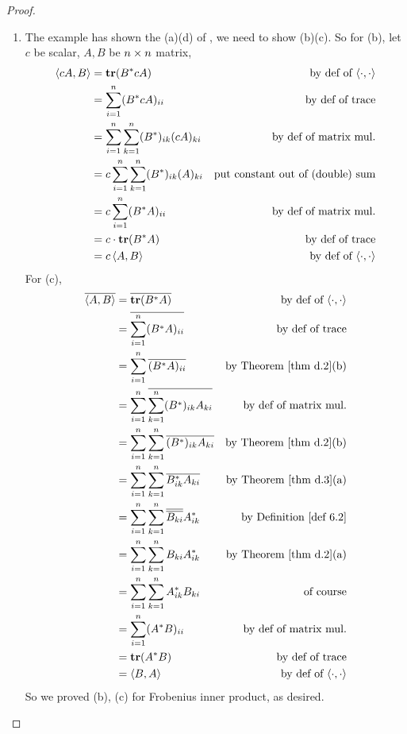 \begin{proof} \ 

\begin{enumerate}
\item The example has shown the (a)(d) of , we need to show (b)(c).
So for (b), let \(c\) be scalar, \(A, B\) be \(n \times n\) matrix,
\begin{align*}
    \left< cA, B \right> & = \textbf{tr}(B^* cA) & \text{by def of \(\left<\cdot, \cdot \right>\)} \\
        & = \sum_{i = 1}^n (B^* cA)_{ii} & \text{by def of trace} \\
        & = \sum_{i = 1}^n \sum_{k = 1}^n (B^*)_{ik} (cA)_{ki} & \text{by def of matrix mul.} \\
        & = c \sum_{i = 1}^n \sum_{k = 1}^n (B^*)_{ik} (A)_{ki} & \text{put constant out of (double) sum} \\
        & = c \sum_{i = 1}^n (B^* A)_{ii} & \text{by def of matrix mul.} \\
        & = c \cdot \textbf{tr}(B^* A) & \text{by def of trace} \\
        & = c \left< A, B \right> & \text{by def of \(\left<\cdot, \cdot \right>\)}
\end{align*}
For (c),
\begin{align*}
    \conjugatet{\LG A, B \RG} & = \conjugatet{\TRACE(B^* A)} & \text{by def of \(\InnerOp\)} \\
        & = \conjugatet{\sum_{i = 1}^n (B^* A)_{ii}} & \text{by def of trace} \\
        & = \sum_{i = 1}^n \conjugatet{(B^* A)_{ii}} & \text{by \THM{d.2}(b)} \\
        & = \sum_{i = 1}^n \conjugatet{\sum_{k = 1}^n (B^*)_{ik} A_{ki}} & \text{by def of matrix mul.} \\
        & = \sum_{i = 1}^n \sum_{k = 1}^n \conjugatet{(B^*)_{ik} A_{ki}} & \text{by \THM{d.2}(b)} \\
        & = \sum_{i = 1}^n \sum_{k = 1}^n \conjugatet{B^*_{ik}} \conjugatet{A_{ki}} & \text{by \THM{d.3}(a)} \\
        & = \sum_{i = 1}^n \sum_{k = 1}^n \conjugatet{\conjugatet{B_{ki}}} A^*_{ik} & \text{by \DEF{6.2}} \\
        & = \sum_{i = 1}^n \sum_{k = 1}^n B_{ki} A^*_{ik} & \text{by \THM{d.2}(a)} \\
        & = \sum_{i = 1}^n \sum_{k = 1}^n A^*_{ik} B_{ki} & \text{of course} \\
        & = \sum_{i = 1}^n (A^* B)_{ii} & \text{by def of matrix mul.} \\
        & = \TRACE(A^* B) & \text{by def of trace} \\
        & = \LG B, A \RG & \text{by def of \(\InnerOp\)}
\end{align*}
So we proved (b), (c) for Frobenius inner product, as desired.


\end{enumerate}
\end{proof}
